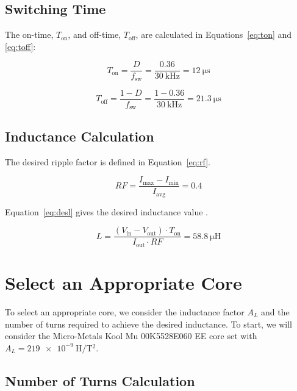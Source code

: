 \documentclass{article}
\begin{document}
\subsection{Switching Time}

The on-time, \( T_{\text{on}} \), and off-time, \( T_{\text{off}} \), are calculated in Equations~\eqref{eq:ton} and \eqref{eq:toff}:

\begin{equation}
\label{eq:ton}
    T_{\text{on}} = \frac{D}{f_{\text{sw}}} = \frac{\num{0.36}}{\SI{30}{\kilo\hertz}} = \SI{12}{\micro\second}
\end{equation}

\begin{equation}
\label{eq:toff}
    T_{\text{off}} = \frac{1 - D}{f_{\text{sw}}} = \frac{1 - \num{0.36}}{\SI{30}{\kilo\hertz}} = \SI{21.3}{\micro\second}
\end{equation}

\subsection{Inductance Calculation}

The desired ripple factor is defined in Equation~\eqref{eq:rf}.

\begin{equation}
\label{eq:rf}
    RF = \frac{I_{\text{max}} - I_{\text{min}}}{I_{\text{avg}}} = \num{0.4}
\end{equation}

Equation~\eqref{eq:desl} gives the desired inductance value \cite[p. 26]{pressman2009}.

\begin{equation}
\label{eq:desl}
    L = \frac{(V_\text{in} - V_\text{out}) \cdot T_\text{on}}{I_\text{out} \cdot RF} = \SI{58.8}{\micro\henry}
\end{equation}

\section{Select an Appropriate Core}

To select an appropriate core, we consider the inductance factor \( A_L \) and the number of turns required to achieve the desired inductance.  To start, we will consider the Micro-Metals Kool Mu 00K5528E060 EE core set with \( A_L = \SI{219e-9}{\henry\per\tesla^2}\).

\subsection{Number of Turns Calculation}
\end{document}
